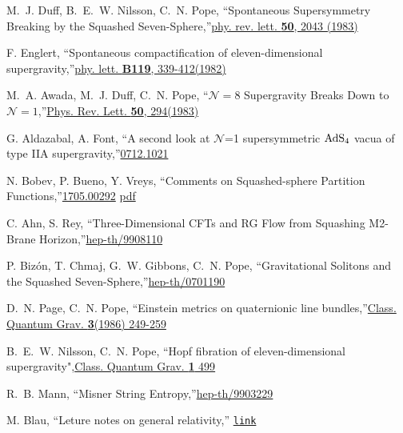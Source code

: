 \documentclass[12pt, a4paper]{article}
\numberwithin{equation}{section}
\newcommand{\cN}{\mathcal{N}}
\begin{document}
\begin{thebibliography}{10}
M.~J. Duff, B.~E.~W. Nilsson, C.~N. Pope, ``{Spontaneous Supersymmetry Breaking by the Squashed Seven-Sphere},''\href{https://journals.aps.org/prl/abstract/10.1103/PhysRevLett.50.2043}{phy. rev. lett. \textbf{50}, 2043 (1983)}

F. Englert, ``{Spontaneous compactification of eleven-dimensional supergravity},''\href{https://www.sciencedirect.com/science/article/abs/pii/0370269382906840}{phy. lett. \textbf{B119}, 339-412(1982)}

M.~A. Awada, M.~J. Duff, C.~N. Pope, ``{$\cN = 8$ Supergravity Breaks Down to $\cN = 1$},''\href{https://journals.aps.org/prl/abstract/10.1103/PhysRevLett.50.294}{Phys. Rev. Lett. \textbf{50}, 294(1983)}

G. Aldazabal, A. Font, ``{A second look at $\cN$=1 supersymmetric ${\rm AdS_4}$ vacua of type IIA supergravity},''\href{https://arxiv.org/abs/0712.1021v2}{0712.1021}

N. Bobev, P. Bueno, Y. Vreys, ``{Comments on Squashed-sphere Partition Functions},''\href{https://arxiv.org/abs/1705.00292}{1705.00292} \href{https://arxiv.org/pdf/1705.00292.pdf}{pdf}

C. Ahn, S. Rey, ``{Three-Dimensional CFTs and RG Flow from Squashing M2-Brane Horizon},''\href{https://arxiv.org/abs/hep-th/9908110v1}{hep-th/9908110}

P. Biz\'on, T. Chmaj, G.~W. Gibbons, C.~N. Pope, ``{Gravitational Solitons and the Squashed Seven-Sphere},''\href{https://arxiv.org/abs/hep-th/0701190v2}{hep-th/0701190}

D.~N. Page, C.~N. Pope, ``{Einstein metrics on quaternionic line bundles},''\href{https://iopscience.iop.org/article/10.1088/0264-9381/3/2/018}{Class. Quantum Grav. \textbf{3}(1986) 249-259}

B.~E.~W. Nilsson, C.~N. Pope, ``Hopf fibration of eleven-dimensional supergravity",\href{https://iopscience.iop.org/article/10.1088/0264-9381/1/5/005}{{\rm Class. Quantum Grav. \textbf{1} 499}}
	
R.~B. Mann, ``{Misner String Entropy},''\href{https://arxiv.org/pdf/hep-th/9903229.pdf}{hep-th/9903229}

M. Blau, ``{Leture notes on general relativity},'' \href{http://www.blau.itp.unibe.ch/newlecturesGR.pdf}{{\tt link}}


\end{thebibliography}
\end{document}
